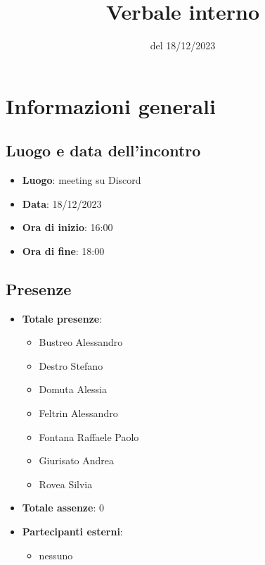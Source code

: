 \documentclass[12pt]{article}
\title{Verbale interno}
\date{del 18/12/2023}
\begin{document}
	\makefirstpage
	
	
	\clearpage
	
	\tableofcontents
	\clearpage

    \section{Informazioni generali}
	
	\subsection{Luogo e data dell'incontro}
	
    	\begin{itemize}
    		\item \textbf{Luogo}: meeting su Discord
    		\item \textbf{Data}: 18/12/2023
    		\item \textbf{Ora di inizio}: 16:00
    		\item \textbf{Ora di fine}: 18:00
    	\end{itemize}
	
	\subsection{Presenze}
	
    	\begin{itemize}
    		\item \textbf{Totale presenze}:
    		\begin{itemize}
    			\item Bustreo Alessandro
    			\item Destro Stefano
    			\item Domuta Alessia 
    			\item Feltrin Alessandro 
    			\item Fontana Raffaele Paolo 
    			\item Giurisato Andrea 
    			\item Rovea Silvia
    		\end{itemize}
    		
    		\item \textbf{Totale assenze}: 0
    		
    		\item \textbf{Partecipanti esterni}:
    		\begin{itemize}
    			\item nessuno
    		\end{itemize}
    	\end{itemize}
\end{document}
